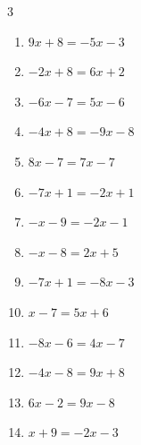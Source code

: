 \begin{multicols}{3}
\begin{enumerate}

  \item $9x+8=-5x-3$


  \item $-2x+8=6x+2$


  \item $-6x-7=5x-6$


\columnbreak %

  \item $-4x+8=-9x-8$


  \item $8x-7=7x-7$

        \phantom{$\displaystyle x=0$}

  \item $-7x+1=-2x+1$

        \phantom{$\displaystyle x=0$}

  \item $-x-9=-2x-1$

        \phantom{$\displaystyle x=8$}

  \item $-x-8=2x+5$


  \item $-7x+1=-8x-3$

        \phantom{$\displaystyle x=-4$}

  \item $x-7=5x+6$


  \item $-8x-6=4x-7$


  \item $-4x-8=9x+8$


  \item $6x-2=9x-8$

        \phantom{$\displaystyle x=2$}

  \item $x+9=-2x-3$


\end{enumerate}
\end{multicols}
